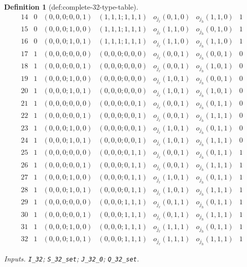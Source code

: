 \documentclass{article}
\newtheorem{definition}{Definition}
\begin{document}
\begin{definition}[def:complete-32-type-table]
\[\begin{array}{c|c|c|c|c|c|c}
14&0&(0,0,0;0,0,1)&(1,1,1;1,1,1)&o_{j_{\ell}}(0,1,0)&o_{j_h}(1,1,0)&1\\
15&0&(0,0,0;1,0,0)&(1,1,1;1,1,1)&o_{j_{\ell}}(1,1,0)&o_{j_h}(0,1,0)&1\\
16&0&(0,0,0;1,0,1)&(1,1,1;1,1,1)&o_{j_{\ell}}(1,1,0)&o_{j_h}(1,1,0)&1\\
17&1&(0,0,0;0,0,0)&(0,0,0;0,0,0)&o_{j_{\ell}}(0,0,1)&o_{j_h}(0,0,1)&0\\
18&1&(0,0,0;0,0,1)&(0,0,0;0,0,0)&o_{j_{\ell}}(0,0,1)&o_{j_h}(1,0,1)&0\\
19&1&(0,0,0;1,0,0)&(0,0,0;0,0,0)&o_{j_{\ell}}(1,0,1)&o_{j_h}(0,0,1)&0\\
20&1&(0,0,0;1,0,1)&(0,0,0;0,0,0)&o_{j_{\ell}}(1,0,1)&o_{j_h}(1,0,1)&0\\
21&1&(0,0,0;0,0,0)&(0,0,0;0,0,1)&o_{j_{\ell}}(0,0,1)&o_{j_h}(0,1,1)&0\\
22&1&(0,0,0;0,0,1)&(0,0,0;0,0,1)&o_{j_{\ell}}(0,0,1)&o_{j_h}(1,1,1)&0\\
23&1&(0,0,0;1,0,0)&(0,0,0;0,0,1)&o_{j_{\ell}}(1,0,1)&o_{j_h}(0,1,1)&0\\
24&1&(0,0,0;1,0,1)&(0,0,0;0,0,1)&o_{j_{\ell}}(1,0,1)&o_{j_h}(1,1,1)&0\\
25&1&(0,0,0;0,0,0)&(0,0,0;0,1,1)&o_{j_{\ell}}(0,0,1)&o_{j_h}(0,1,1)&1\\
26&1&(0,0,0;0,0,1)&(0,0,0;0,1,1)&o_{j_{\ell}}(0,0,1)&o_{j_h}(1,1,1)&1\\
27&1&(0,0,0;1,0,0)&(0,0,0;0,1,1)&o_{j_{\ell}}(1,0,1)&o_{j_h}(0,1,1)&1\\
28&1&(0,0,0;1,0,1)&(0,0,0;0,1,1)&o_{j_{\ell}}(1,0,1)&o_{j_h}(1,1,1)&1\\
29&1&(0,0,0;0,0,0)&(0,0,0;1,1,1)&o_{j_{\ell}}(0,1,1)&o_{j_h}(0,1,1)&1\\
30&1&(0,0,0;0,0,1)&(0,0,0;1,1,1)&o_{j_{\ell}}(0,1,1)&o_{j_h}(1,1,1)&1\\
31&1&(0,0,0;1,0,0)&(0,0,0;1,1,1)&o_{j_{\ell}}(1,1,1)&o_{j_h}(0,1,1)&1\\
32&1&(0,0,0;1,0,1)&(0,0,0;1,1,1)&o_{j_{\ell}}(1,1,1)&o_{j_h}(1,1,1)&1
\end{array}\]
\par\smallskip\noindent\emph{Inputs.} \texttt{I\_\allowbreak{}32}; \texttt{S\_\allowbreak{}32\_\allowbreak{}set}; \texttt{J\_\allowbreak{}32\_\allowbreak{}0}; \texttt{Q\_\allowbreak{}32\_\allowbreak{}set}.
\end{definition}
\end{document}
